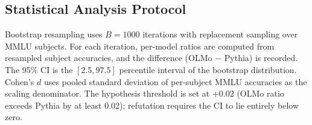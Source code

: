 \subsection{Statistical Analysis Protocol}

Bootstrap resampling uses $B = 1000$ iterations with replacement sampling over MMLU subjects. For each iteration, per-model ratios are computed from resampled subject accuracies, and the difference (OLMo $-$ Pythia) is recorded. The 95\% CI is the $[2.5, 97.5]$ percentile interval of the bootstrap distribution. Cohen's $d$ uses pooled standard deviation of per-subject MMLU accuracies as the scaling denominator. The hypothesis threshold is set at $+0.02$ (OLMo ratio exceeds Pythia by at least 0.02); refutation requires the CI to lie entirely below zero.
